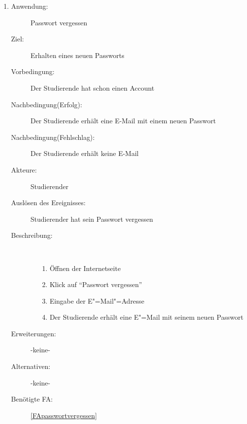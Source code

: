 \documentclass[parskip=full]{scrartcl}
\newcommand{\swtLabel}[1]{\textbf{/#1\arabic*0/}}
\begin{document}
\begin{enumerate}[label=\swtLabel{S}]
  \item \label{UCstudNewPasswort}
    \begin{description}
  	\item[Anwendung:] Passwort vergessen
  	\item[Ziel:] Erhalten eines neuen Passworts
  	\item[Vorbedingung:] Der Studierende hat schon einen Account
  	\item[Nachbedingung(Erfolg):] Der Studierende erhält eine E-Mail mit einem
  	neuen Passwort
  	\item[Nachbedingung(Fehlschlag):] Der Studierende erhält keine E-Mail
  	\item[Akteure:] Studierender
  	\item[Auslösen des Ereignisses:] Studierender hat sein Passwort vergessen
  	\item[Beschreibung:]~
  	\begin{enumerate}
  	  \item[1.] Öffnen der Internetseite
      \item[2.] Klick auf \enquote{Passwort vergessen}
      \item[3.] Eingabe der E"=Mail"=Adresse
      \item[4.] Der Studierende erhält eine E"=Mail mit seinem neuen Passwort
  	\end{enumerate}
  	\item[Erweiterungen:] -keine-
  	\item[Alternativen:] -keine-
  	\item[Benötigte FA:] \ref{FApasswortvergessen}
  \end{description}
  

\end{enumerate}
\end{document}
